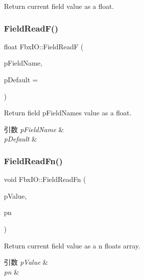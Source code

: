 Return current field value as a float. 

\mbox{\label{class_fbx_i_o_a06dabe07941287f29e58ce4d09504f78}} 
\subsubsection{\texorpdfstring{Field\+Read\+F()}{FieldReadF()}\hspace{0.1cm}{\footnotesize\ttfamily [2/2]}}
{\footnotesize\ttfamily float Fbx\+I\+O\+::\+Field\+ReadF (\begin{DoxyParamCaption}\item[{const char $\ast$}]{p\+Field\+Name,  }\item[{float}]{p\+Default = {} }\end{DoxyParamCaption})}

Return field p\+Field\+Name\textquotesingle{}s value as a float. 
\begin{DoxyParams}{引数}
{\em p\+Field\+Name} & \\
\hline
{\em p\+Default} & \\
\hline
\end{DoxyParams}
\mbox{\label{class_fbx_i_o_ab546c7e72a06e2f2c37f59bc9e273492}} 
\subsubsection{\texorpdfstring{Field\+Read\+Fn()}{FieldReadFn()}\hspace{0.1cm}{\footnotesize\ttfamily [1/2]}}
{\footnotesize\ttfamily void Fbx\+I\+O\+::\+Field\+Read\+Fn (\begin{DoxyParamCaption}\item[{float $\ast$}]{p\+Value,  }\item[{\hyperlink{fbxtypes_8h_ae9fb141d8158a730aa85ec5ff2ea3f6b}{Fbx\+U\+Int}}]{pn }\end{DoxyParamCaption})}

Return current field value as a n floats array. 
\begin{DoxyParams}{引数}
{\em p\+Value} & \\
\hline
{\em pn} & \\
\hline
\end{DoxyParams}
\mbox{\label{class_fbx_i_o_a38983e625792b5f4b660c1fc812fd216}} 
